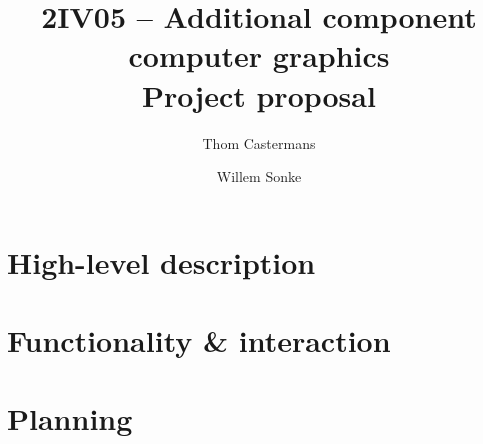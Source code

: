 \documentclass[a4paper,10pt]{article}
\title{2IV05 -- Additional component computer graphics \\ \textbf{Project proposal}}
\author{Thom Castermans \and Willem Sonke}
\begin{document}
\maketitle

\section{High-level description}
\label{sec:general idea}


\section{Functionality \& interaction}
\label{sec:user-input}


\section{Planning}
\label{sec:planning}

\end{document}
